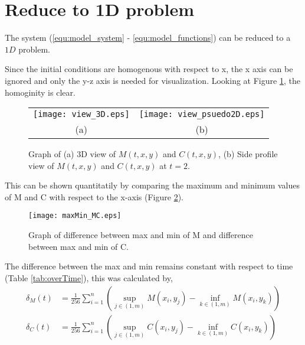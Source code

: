 \section{Reduce to 1D problem}

  The system (\ref{equ:model_system} - \ref{equ:model_functions}) can be reduced to a $1D$ problem. 
  
  
  Since the initial conditions are homogenous with respect to x, the x axis can be ignored and only the y-z axis is needed for visualization. Looking at Figure \ref{fig:visual}, the homoginity is clear.
   
  \begin{figure}[h!bt]
    \begin{center}
      \begin{tabular}{c c}
        \texttt{[image: view\_3D.eps]} &
        \texttt{[image: view\_psuedo2D.eps]} \\
        (a) & (b) \\
      \end{tabular}
      \caption{Graph of (a) 3D view of $M(t,x,y)$ and $C(t,x,y)$, (b) Side profile view of $M(t,x,y)$ and $C(t,x,y)$ at $t=2$.} 
      \label{fig:visual}
    \end{center}
  \end{figure}
   
    This can be shown quantitatily by comparing the maximum and minimum values of M and C with respect to the x-axis (Figure \ref{fig:maxMin}). 
  \begin{figure}[h!bt]
    \begin{center}
        \texttt{[image: maxMin\_MC.eps]}
      \caption{Graph of difference between max and min of M and difference between max and min of C.}
      \label{fig:maxMin}
    \end{center}
  \end{figure}

  The difference between the max and min remains constant with respect to time (Table \ref{tab:overTime}), this was calculated by,
  \begin{equation}
    \begin{aligned}
      \delta_M(t) &= \frac{1}{256}\sum_{i = 1}^n \left( \sup_{j \in (1,m)} M(x_i,y_j) - \inf_{k \in (1,m)} M(x_i,y_k) \right) \\
      \delta_C(t) &= \frac{1}{256}\sum_{i = 1}^n \left( \sup_{j \in (1,m)} C(x_i,y_j) - \inf_{k \in (1,m)} C(x_i,y_k) \right)   
    \end{aligned}
  \end{equation}
  
